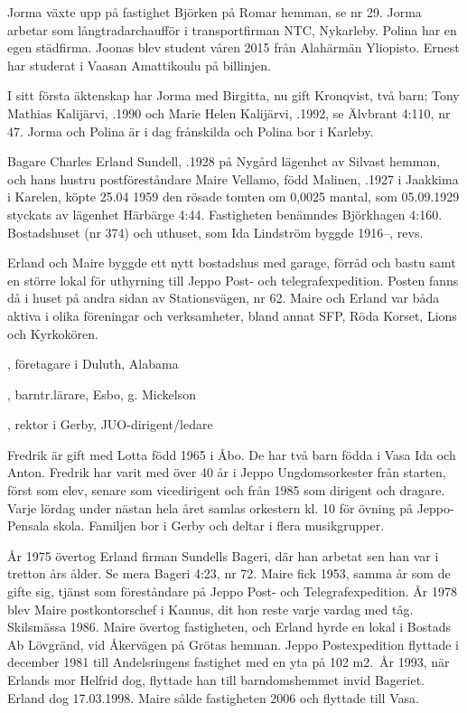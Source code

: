 Jorma växte upp på fastighet Björken på Romar hemman, se nr 29. Jorma arbetar som långtradarchaufför i transportfirman NTC, Nykarleby. Polina har en egen städfirma. Joonas blev student våren 2015 från Alahärmän Yliopisto. Ernest har studerat i Vaasan Amattikoulu på billinjen.

I sitt första äktenskap har Jorma med Birgitta, nu gift Kronqvist, två barn; Tony Mathias Kalijärvi,	.1990 och Marie Helen Kalijärvi, .1992, se Älvbrant 4:110, nr 47. Jorma och Polina är i dag frånskilda och Polina bor i Karleby.


%
Bagare Charles Erland Sundell, .1928 på Nygård lägenhet av Silvast hemman, och hans hustru 		postföreståndare Maire Vellamo, född Malinen, .1927 i Jaakkima i Karelen, köpte 25.04 1959 den rösade tomten om 0,0025 mantal, som 05.09.1929 styckats av lägenhet Härbärge 4:44. Fastigheten benämndes Björkhagen 4:160. Bostadshuset (nr 374) och uthuset, som Ida Lindström byggde 1916--, revs.

Erland och Maire byggde ett nytt bostadshus med garage, förråd och bastu samt en större lokal för uthyrning till Jeppo 	Post- och telegrafexpedition. Posten fanns då i huset på andra sidan av Stationsvägen, nr 62.	Maire och Erland var båda aktiva i olika föreningar och	verksamheter, bland annat SFP, Röda Korset, Lions och	Kyrkokören.
\begin{jhchildren}
  \item {}, företagare i Duluth, Alabama
  \item {}, barntr.lärare, Esbo, g. Mickelson
  \item {}, rektor i Gerby, JUO-dirigent/ledare
\end{jhchildren}
Fredrik är gift med Lotta född 1965 i Åbo. De har två barn födda i Vasa Ida och Anton. Fredrik har varit med över 40 år i Jeppo Ungdomsorkester från starten, först som elev, senare som vicedirigent och från 1985 som dirigent och dragare. Varje lördag under nästan hela året samlas orkestern kl. 10 för övning på Jeppo-Pensala	skola. Familjen bor i Gerby och deltar i flera musikgrupper.

År 1975 övertog Erland firman Sundells Bageri, där han arbetat sen han var i tretton års ålder. Se mera Bageri 4:23, nr 72. Maire fick 1953, samma år som de gifte sig, tjänst som föreståndare på Jeppo Post- och Telegrafexpedition. År 1978 blev Maire postkontorschef i Kannus, dit hon reste varje vardag med tåg. Skilsmässa 1986. Maire övertog fastigheten, och Erland hyrde en lokal i Bostads Ab Lövgränd, vid Åkervägen på Grötas hemman. Jeppo Postexpedition flyttade i december 1981 till Andelsringens fastighet med en yta på 102 m2. År 1993, när Erlands mor Helfrid dog, flyttade han till barndomshemmet invid Bageriet. Erland dog 17.03.1998. Maire sålde fastigheten 2006 och flyttade till Vasa.


